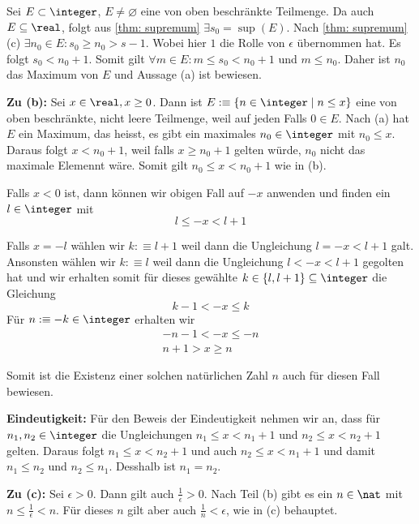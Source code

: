 \begin{prf}
  Sei $E \subset \integer$, $E \neq \varnothing$ eine von oben beschränkte Teilmenge. Da auch $E \subseteq \real$, folgt aus \ref{thm: supremum} $\exists s_0 = \sup (E)$. Nach \ref{thm: supremum} (c) $\exists n_0 \in E: s_0 \geq n_0 > s-1$. Wobei hier $1$ die Rolle von $\epsilon$ übernommen hat. Es folgt $s_0 < n_0+1$. Somit gilt $\forall m \in E: m \leq s_0 < n_0+1$ und $m \leq n_0$. Daher ist $n_0$ das Maximum von $E$ und Aussage (a) ist bewiesen.

  \textbf{Zu (b):} Sei $x \in \real, x \geq 0$. Dann ist $E :\equiv \{n \in \integer \mid n\leq x\}$ eine von oben beschränkte, nicht leere Teilmenge, weil auf jeden Falls $0 \in E$. Nach (a) hat $E$ ein Maximum, das heisst, es gibt ein maximales $n_0 \in \integer$ mit $n_0 \leq x$. Daraus folgt $x < n_0+1$, weil falls $x \geq n_0+1$ gelten würde, $n_0$ nicht das maximale Elemennt wäre. Somit gilt $n_0 \leq x < n_0+1$ wie in (b).

  Falls $x<0$ ist, dann können wir obigen Fall auf $-x$ anwenden und finden ein $l \in \integer$ mit
  \[
    l \leq -x < l +1
  \]

  Falls $x=-l$ wählen wir $k :\equiv l+1$ weil dann die Ungleichung $l = -x < l+1$ galt. Ansonsten wählen wir $k :\equiv l$ weil dann die Ungleichung $l < -x < l+1$ gegolten hat und wir erhalten somit für dieses gewählte $k \in \{ l, l+1\} \subseteq \integer$ die Gleichung
  \[
    k-1 < -x \leq k
  \]
  Für $n :\equiv -k \in \integer$ erhalten wir
  \[
  \begin{aligned}
    -n-1 < -x \leq -n \\
    n+1 > x \geq n
  \end{aligned}
  \]

  Somit ist die Existenz einer solchen natürlichen Zahl $n$ auch für diesen Fall bewiesen.

  \textbf{Eindeutigkeit:} Für den Beweis der Eindeutigkeit nehmen wir an, dass für $n_1, n_2 \in \integer$ die Ungleichungen $n_1 \leq x < n_1 + 1$ und $n_2 \leq x < n_2+1$ gelten. Daraus folgt $n_1 \leq x < n_2 + 1$ und auch $n_2 \leq x < n_1 + 1$ und damit $n_1 \leq n_2$ und $n_2 \leq n_1$. Desshalb ist $n_1 = n_2$.

  \textbf{Zu (c):} Sei $\epsilon > 0$. Dann gilt auch $\frac{1}{\epsilon} > 0$. Nach Teil (b) gibt es ein $n \in \nat$ mit $n \leq \frac{1}{\epsilon} < n$. Für dieses $n$ gilt aber auch $\frac{1}{n} < \epsilon$, wie in (c) behauptet.
\end{prf}


